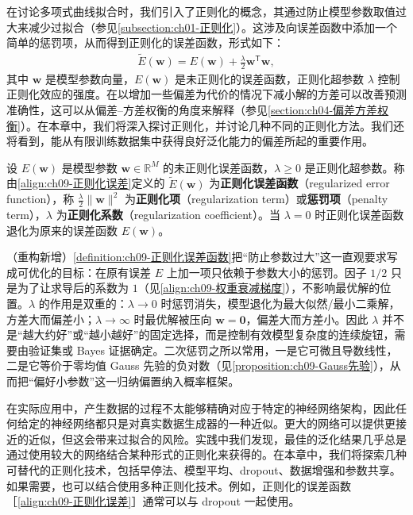 \documentclass[../../main.tex]{subfiles}
\begin{document}
在讨论多项式曲线拟合时，我们引入了正则化的概念，其通过防止模型参数取值过大来减少过拟合（参见\cref{subsection:ch01-正则化}）。这涉及向误差函数中添加一个简单的惩罚项，从而得到正则化的误差函数，形式如下：
\begin{align}
\widetilde{E}(\boldsymbol{w}) = E(\boldsymbol{w}) + \frac{\lambda}{2}\boldsymbol{w}^{\mathsf T}\boldsymbol{w},
\label{align:ch09-正则化误差}
\end{align}
其中 $\boldsymbol{w}$ 是模型参数向量，$E(\boldsymbol{w})$ 是未正则化的误差函数，正则化超参数 $\lambda$ 控制正则化效应的强度。在以增加一些偏差为代价的情况下减小解的方差可以改善预测准确性，这可以从偏差--方差权衡的角度来解释（参见\cref{section:ch04-偏差方差权衡}）。在本章中，我们将深入探讨正则化，并讨论几种不同的正则化方法。我们还将看到，能从有限训练数据集中获得良好泛化能力的偏差所起的重要作用。

\begin{definition}[正则化误差函数]\label{definition:ch09-正则化误差函数}
设 $E(\boldsymbol{w})$ 是模型参数 $\boldsymbol{w}\in\mathbb{R}^{M}$ 的未正则化误差函数，$\lambda\geqslant0$ 是正则化超参数。称由\eqref{align:ch09-正则化误差}定义的 $\widetilde{E}(\boldsymbol{w})$ 为\textbf{正则化误差函数}（regularized error function），称 $\frac{\lambda}{2}\|\boldsymbol{w}\|^{2}$ 为\textbf{正则化项}（regularization term）或\textbf{惩罚项}（penalty term），$\lambda$ 为\textbf{正则化系数}（regularization coefficient）。当 $\lambda=0$ 时正则化误差函数退化为原来的误差函数 $E(\boldsymbol{w})$。
\end{definition}

\begin{remark}（重构新增）\cref{definition:ch09-正则化误差函数}把“防止参数过大”这一直观要求写成可优化的目标：在原有误差 $E$ 上加一项只依赖于参数大小的惩罚。因子 $1/2$ 只是为了让求导后的系数为 $1$（见\cref{align:ch09-权重衰减梯度}），不影响最优解的位置。$\lambda$ 的作用是双重的：$\lambda\to0$ 时惩罚消失，模型退化为最大似然/最小二乘解，方差大而偏差小；$\lambda\to\infty$ 时最优解被压向 $\boldsymbol{w}=\boldsymbol{0}$，偏差大而方差小。因此 $\lambda$ 并不是“越大约好”或“越小越好”的固定选择，而是控制有效模型复杂度的连续旋钮，需要由验证集或 Bayes 证据确定。二次惩罚之所以常用，一是它可微且导数线性，二是它等价于零均值 Gauss 先验的负对数（见\cref{proposition:ch09-Gauss先验}），从而把“偏好小参数”这一归纳偏置纳入概率框架。
\end{remark}

在实际应用中，产生数据的过程不太能够精确对应于特定的神经网络架构，因此任何给定的神经网络都只是对真实数据生成器的一种近似。更大的网络可以提供更接近的近似，但这会带来过拟合的风险。实践中我们发现，最佳的泛化结果几乎总是通过使用较大的网络结合某种形式的正则化来获得的。在本章中，我们将探索几种可替代的正则化技术，包括早停法、模型平均、dropout、数据增强和参数共享。如果需要，也可以结合使用多种正则化技术。例如，正则化的误差函数［\eqref{align:ch09-正则化误差}］通常可以与 dropout 一起使用。
\end{document}
